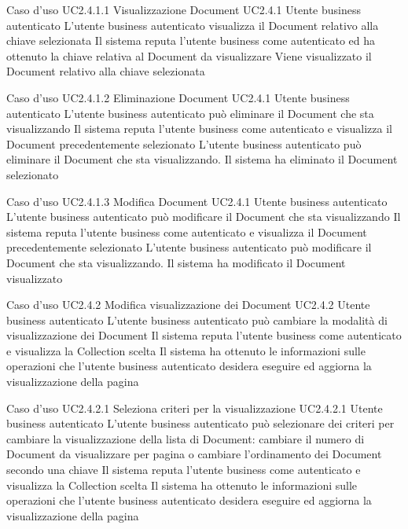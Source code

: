 \UCtitle
{Caso d'uso UC2.4.1.1}
{Visualizzazione Document}
\UC
{UC2.4.1}
{Utente business autenticato}
{L'utente business autenticato visualizza il Document relativo alla chiave selezionata}
{Il sistema reputa l'utente business come autenticato ed ha ottenuto la chiave relativa al Document da visualizzare}
\post
{Viene visualizzato il Document relativo alla chiave selezionata}

\UCtitle
{Caso d'uso UC2.4.1.2}
{Eliminazione Document}
\UC
{UC2.4.1}
{Utente business autenticato}
{L'utente business autenticato può eliminare il Document che sta visualizzando}
{Il sistema reputa l'utente business come autenticato e visualizza il Document precedentemente selezionato}
\scenario
{L'utente business autenticato può eliminare il Document che sta visualizzando.}
\post
{Il sistema ha eliminato il Document selezionato}

\UCtitle
{Caso d'uso UC2.4.1.3}
{Modifica Document}
\UC
{UC2.4.1}
{Utente business autenticato}
{L'utente business autenticato può modificare il Document che sta visualizzando}
{Il sistema reputa l'utente business come autenticato e visualizza il Document precedentemente selezionato}
\scenario
{L'utente business autenticato può modificare il Document che sta visualizzando.}
\post
{Il sistema ha modificato il Document visualizzato}

\UCtitle
{Caso d'uso UC2.4.2}
{Modifica visualizzazione dei Document}
\UC
{UC2.4.2}
{Utente business autenticato}
{L'utente business autenticato può cambiare la modalità di visualizzazione dei Document}
{Il sistema reputa l'utente business come autenticato e visualizza la Collection scelta}
\post
{Il sistema ha ottenuto le informazioni sulle operazioni che l'utente business autenticato desidera eseguire ed aggiorna la visualizzazione della pagina}

\UCtitle
{Caso d'uso UC2.4.2.1}
{Seleziona criteri per la visualizzazione}
\UC
{UC2.4.2.1}
{Utente business autenticato}
{L'utente business autenticato può selezionare dei criteri per cambiare la visualizzazione della lista di Document: cambiare il numero di Document da visualizzare per pagina o cambiare l'ordinamento dei Document secondo una chiave}
{Il sistema reputa l'utente business come autenticato e visualizza la Collection scelta}
\post
{Il sistema ha ottenuto le informazioni sulle operazioni che l'utente business autenticato desidera eseguire ed aggiorna la visualizzazione della pagina}


